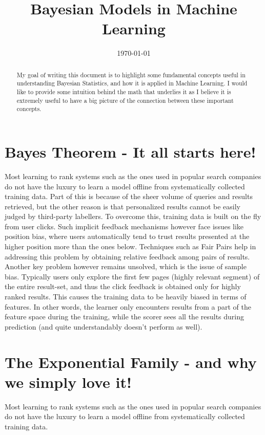 \documentclass[a4paper]{article}
\title{Bayesian Models in Machine Learning}
\author{}
\date{\today}
\begin{document}
\maketitle

\begin{abstract}
\noindent My goal of writing this document is to highlight some fundamental concepts useful in  understanding Bayesian Statistics, and how it is applied in Machine Learning. I would like to provide some intuition behind the math that underlies it as I believe it is extremely useful to have a big picture of the connection between these important concepts.
\end{abstract}

\section{Bayes Theorem - It all starts here!}

\noindent Most learning to rank systems such as the ones used in popular search companies do not have the luxury to learn a model offline from systematically collected training data. Part of this is because of the sheer volume of queries and results retrieved, but the other reason is that personalized results cannot be easily judged by third-party labellers. To overcome this, training data is built on the fly from user clicks. Such implicit feedback mechanisms however face issues like position bias, where users automatically tend to trust results presented at the higher position more than the ones below. Techniques such as Fair Pairs \citep{radlinski2006minimally} help in addressing this problem by obtaining relative feedback among pairs of results. Another key problem however remains unsolved, which is the issue of sample bias. Typically users only explore the first few pages (highly relevant segment) of the entire result-set, and thus the click feedback is obtained only for highly ranked results. This causes the training data to be heavily biased in terms of features. In other words, the learner only encounters results from a part of the feature space during the training, while the scorer sees all the results during prediction (and quite understandably doesn’t perform as well). \\

\section{The Exponential Family - and why we simply love it!}
\noindent Most learning to rank systems such as the ones used in popular search companies do not have the luxury to learn a model offline from systematically collected training data.
\end{document}
